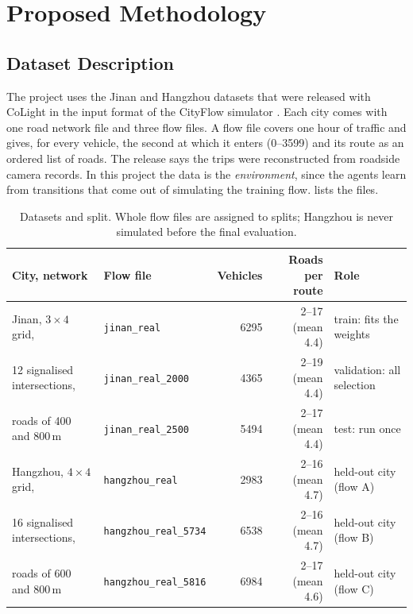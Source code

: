 \chapter{Proposed Methodology}
\label{ch:method}

\section{Dataset Description}
\label{sec:dataset}

The project uses the Jinan and Hangzhou datasets that were released with CoLight
\citep{wei2019colight} in the input format of the CityFlow simulator \citep{zhang2019cityflow}.
Each city comes with one road network file and three flow files. A flow file covers one hour
of traffic and gives, for every vehicle, the second at which it enters (0--3599) and its route
as an ordered list of roads. The release says the trips were reconstructed from roadside camera
records. In this project the data is the \emph{environment}, since the agents learn from
transitions that come out of simulating the training flow.  lists the files.

\begin{table}[t]
\centering\small
\caption[Datasets and split]{Datasets and split. Whole flow files are assigned to splits; Hangzhou is never
simulated before the final evaluation.}
\label{tab:data}
\begin{tabular}{llrrl}
\toprule
City, network & Flow file & Vehicles & Roads per route & Role \\
\midrule
Jinan, $3\times4$ grid, & \texttt{jinan\_real} & 6295 & 2--17 (mean 4.4) & train: fits the weights \\
12 signalised intersections, & \texttt{jinan\_real\_2000} & 4365 & 2--19 (mean 4.4) & validation: all selection \\
roads of 400 and 800\,m & \texttt{jinan\_real\_2500} & 5494 & 2--17 (mean 4.4) & test: run once \\
\midrule
Hangzhou, $4\times4$ grid, & \texttt{hangzhou\_real} & 2983 & 2--16 (mean 4.7) & held-out city (flow A) \\
16 signalised intersections, & \texttt{hangzhou\_real\_5734} & 6538 & 2--16 (mean 4.7) & held-out city (flow B) \\
roads of 600 and 800\,m & \texttt{hangzhou\_real\_5816} & 6984 & 2--17 (mean 4.6) & held-out city (flow C) \\
\bottomrule
\end{tabular}
\end{table}

